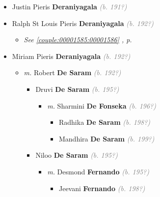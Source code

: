 \documentclass[10pt, openany]{book}
\begin{document}
\begin{itemize}
{\begin{itemize}
{\begin{itemize}
{\begin{itemize}
\end{itemize}}
\end{itemize}
   }
\item{Justin Pieris \textbf{Deraniyagala} \textcolor{gray}{\textit{(b. 191?)}}
  }
\item{Ralph St Louis Pieris \textbf{Deraniyagala} \textcolor{gray}{\textit{(b. 192?)}}
\begin{itemize}
\item{\textcolor{slteal}{\textit{See  \autoref{couple:00001585:00001586} \textit{, p. \pageref{couple:00001585:00001586} }}}}
\end{itemize}
    }
\item{Miriam Pieris \textbf{Deraniyagala} \textcolor{gray}{\textit{(b. 192?)}}
\begin{itemize}
\item{\textit{m.} Robert \textbf{De Saram} \textcolor{gray}{\textit{(b. 192?)}}   \label{couple:00001714:00001715} \begin{itemize}
\item{Druvi \textbf{De Saram} \textcolor{gray}{\textit{(b. 195?)}}
\begin{itemize}
\item{\textit{m.} Sharmini \textbf{De Fonseka} \textcolor{gray}{\textit{(b. 196?)}}   \label{couple:00001724:00001725} \begin{itemize}
\item{Radhika \textbf{De Saram} \textcolor{gray}{\textit{(b. 198?)}}
  }
\item{Mandhira \textbf{De Saram} \textcolor{gray}{\textit{(b. 199?)}}
  }
\end{itemize}}
\end{itemize}
  }
\item{Niloo \textbf{De Saram} \textcolor{gray}{\textit{(b. 195?)}}
\begin{itemize}
\item{\textit{m.} Desmond \textbf{Fernando} \textcolor{gray}{\textit{(b. 195?)}}   \label{couple:00001728:00001729} \begin{itemize}
\item{Jeevani \textbf{Fernando} \textcolor{gray}{\textit{(b. 198?)}}
 }
\end{itemize}}

\end{itemize}}
\end{itemize}}
\end{itemize}}
\end{itemize}}
\end{itemize}
\end{document}
